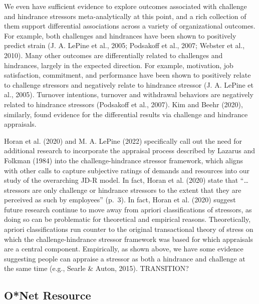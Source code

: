 \documentclass[
  english,
  man]{apa6}
\begin{document}
We even have sufficient evidence to explore outcomes associated with challenge and hindrance stressors meta-analytically at this point, and a rich collection of them support differential associations across a variety of organizational outcomes. For example, both challenges and hindrances have been shown to positively predict strain (J. A. LePine et al., 2005; Podsakoff et al., 2007; Webster et al., 2010). Many other outcomes are differentially related to challenges and hindrances, largely in the expected direction. For example, motivation, job satisfaction, commitment, and performance have been shown to positively relate to challenge stressors and negatively relate to hindrance stressor (J. A. LePine et al., 2005). Turnover intentions, turnover and withdrawal behaviors are negatively related to hindrance stressors (Podsakoff et al., 2007). Kim and Beehr (2020), similarly, found evidence for the differential results via challenge and hindrance appraisals.

Horan et al. (2020) and M. A. LePine (2022) specifically call out the need for additional research to incorporate the appraisal process described by Lazarus and Folkman (1984) into the challenge-hindrance stressor framework, which aligns with other calls to capture subjective ratings of demands and resources into our study of the overarching JD-R model. In fact, Horan et al. (2020) state that ``\ldots stressors are only challenge or hindrance stressors to the extent that they are perceived as such by employees'' (p.~3). In fact, Horan et al. (2020) suggest future research continue to move away from apriori classifications of stressors, as doing so can be problematic for theoretical and empirical reasons. Theoretically, apriori classifications run counter to the original transactional theory of stress on which the challenge-hindrance stressor framework was based for which appraisals are a central component. Empirically, as shown above, we have some evidence suggesting people can appraise a stressor as both a hindrance and challenge at the same time (e.g., Searle \& Auton, 2015). TRANSITION?

\hypertarget{onet-resource}{%
\subsection{O*Net Resource}\label{onet-resource}}
\end{document}
